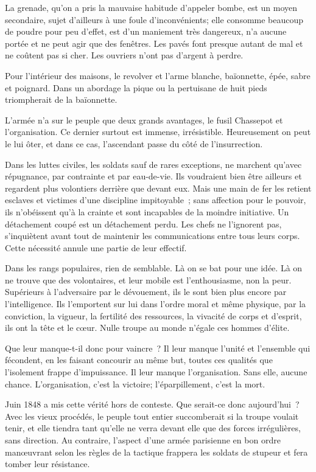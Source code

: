 \documentclass[french,twoside]{book} %
\begin{document}
La grenade, qu’on a pris la mauvaise habitude d’appeler bombe, est un moyen secondaire, sujet d’ailleurs à une foule d’inconvénients; elle consomme beaucoup de poudre pour peu d’effet, est d’un maniement très dangereux, n’a aucune portée et ne peut agir que des fenêtres. Les pavés font presque autant de mal et ne coûtent pas si cher. Les ouvriers n’ont pas d’argent à perdre.\par
Pour l’intérieur des maisons, le revolver et l’arme blanche, baïonnette, épée, sabre et poignard. Dans un abordage la pique ou la pertuisane de huit pieds triompherait de la baïonnette.\par
L'armée n’a sur le peuple que deux grands avantages, le fusil Chassepot et l’organisation. Ce dernier surtout est immense, irrésistible. Heureusement on peut le lui ôter, et dans ce cas, l’ascendant passe du côté de l’insurrection.\par
Dans les luttes civiles, les soldats sauf de rares exceptions, ne marchent qu’avec répugnance, par contrainte et par eau-de-vie. Ils voudraient bien être ailleurs et regardent plus volontiers derrière que devant eux. Mais une main de fer les retient esclaves et victimes d’une discipline impitoyable ; sans affection pour le pouvoir, ils n’obéissent qu’à la crainte et sont incapables de la moindre initiative. Un détachement coupé est un détachement perdu. Les chefs ne l’ignorent pas, s’inquiètent avant tout de maintenir les communications entre tous leurs corps. Cette nécessité annule une partie de leur effectif.\par
Dans les rangs populaires, rien de semblable. Là on se bat pour une idée. Là on ne trouve que des volontaires, et leur mobile est l’enthousiasme, non la peur. Supérieurs à l’adversaire par le dévouement, ils le sont bien plus encore par l’intelligence. Ils l’emportent sur lui dans l’ordre moral et même physique, par la conviction, la vigueur, la fertilité des ressources, la vivacité de corps et d’esprit, ils ont la tête et le cœur. Nulle troupe au monde n’égale ces hommes d’élite.\par
Que leur manque-t-il donc pour vaincre ? Il leur manque l’unité et l’ensemble qui fécondent, en les faisant concourir au même but, toutes ces qualités que l’isolement frappe d’impuissance. Il leur manque l’organisation. Sans elle, aucune chance. L'organisation, c’est la victoire; l’éparpillement, c’est la mort.\par
Juin 1848 a mis cette vérité hors de conteste. Que serait-ce donc aujourd’hui ? Avec les vieux procédés, le peuple tout entier succomberait si la troupe voulait tenir, et elle tiendra tant qu’elle ne verra devant elle que des forces irrégulières, sans direction. Au contraire, l’aspect d’une armée parisienne en bon ordre manœuvrant selon les règles de la tactique frappera les soldats de stupeur et fera tomber leur résistance.\par
\end{document}
